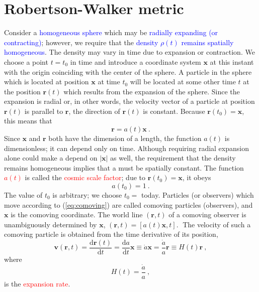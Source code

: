 \documentclass[12pt,a4paper]{article}
\renewcommand{\vec}[1]{\boldsymbol{#1}}
\newcommand{\dif}{\mathrm{d}}
\begin{document}
\section{Robertson-Walker metric}
\cite{2015eaci.book.....S} Consider a \textcolor{blue}{homogeneous sphere} which may be \textcolor{blue}{radially expanding (or contracting)}; however, we require that the \textcolor{blue}{density $\rho(t)$ remains spatially homogeneous}. The density may vary in time due to expansion or contraction. We choose a point $t = t_0$ in time and introduce a coordinate system $\vec{x}$ at this instant with the origin coinciding with the center of the sphere. A particle in the sphere which is located at position $\vec{x}$ at time $t_0$ will be located at some other time $t$ at the position $\vec{r}(t)$ which results from the expansion of the sphere. Since the  expansion is radial or, in other words, the velocity vector of a particle at position $\vec{r}(t)$ is parallel to $\vec{r}$, the direction of $\vec{r}(t)$ is constant. Because $\vec{r}(t_0) = \vec{x}$, this means that
\begin{equation}
\vec{r} = a(t) \vec{x} ~.
\label{eq:comoving}
\end{equation}
Since $\vec{x}$ and $\vec{r}$ both have the dimension of a length, the function $a(t)$ is dimensionless; it can depend only on time. Although requiring radial expansion alone could make a depend on $|\vec{x}|$ as well, the requirement that the density remains homogeneous implies that a must be spatially constant. The function \textcolor{red}{$a(t)$} is called the \textcolor{red}{cosmic scale factor}; due to $\vec{r}(t_0) = \vec{x}$, it obeys
\begin{equation}
a(t_0) = 1 ~.
\end{equation}
The value of $t_0$ is arbitrary; we choose $t_0 =$ today. Particles (or observers) which move according to (\ref{eq:comoving}) are called comoving particles (observers), and $\vec{x}$ is the comoving coordinate. The world line $(\vec{r}, t)$ of a comoving observer is unambiguously determined by $\vec{x}$, $(\vec{r}, t) = [a(t) \vec{x}, t]$.
The velocity of such a comoving particle is obtained from the time derivative of its position,
\begin{equation}
\vec{v}(\vec{r}, t) = \dfrac{\dif \vec{r}(t)}{\dif t} =  \dfrac{\dif a}{\dif t} \vec{x} \equiv \dot{a} \vec{x} = \dfrac{\dot{a}}{a} \vec{r} \equiv H(t) \vec{r} ~,
\end{equation}
where 
\begin{equation}
H(t) = \dfrac{\dot{a}}{a} ~,
\end{equation}
is the \textcolor{red}{expansion rate}. 
\end{document}

